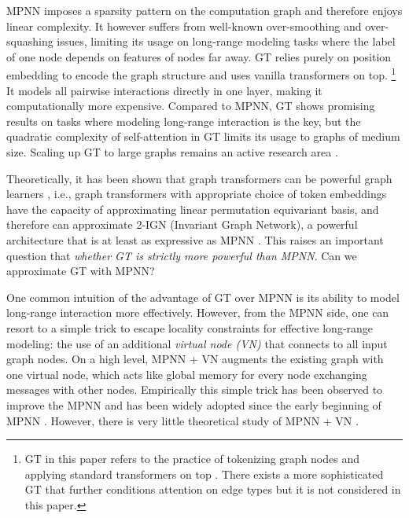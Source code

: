 \documentclass[nohyperref]{article}
\theoremstyle{plain}
\theoremstyle{definition}
\theoremstyle{remark}
\begin{document}
MPNN imposes a sparsity pattern on the computation graph and therefore enjoys linear complexity. It however suffers from well-known over-smoothing \citep{li2018deeper,oono2019graph,cai2020note} and over-squashing \citep{alon2020bottleneck,topping2021understanding} issues, limiting its usage on long-range modeling tasks where the label of one node depends on features of nodes far away. GT relies purely on position embedding to encode the graph structure and uses vanilla transformers on top. \footnote{GT in this paper refers to the practice of tokenizing graph nodes and applying standard transformers on top \citep{ying2021transformers,kim2022pure}. There exists a more sophisticated GT \citep{kreuzer2021rethinking} that further conditions attention on edge types but it is not considered in this paper. } It models all pairwise interactions directly in one layer, making it computationally more expensive. Compared to MPNN, GT shows promising results on tasks where modeling long-range interaction is the key, but the quadratic complexity of self-attention in GT limits its usage to graphs of medium size. Scaling up GT to large graphs remains an active research area \citep{wunodeformer}. 


Theoretically, it has been shown that graph transformers can be powerful graph learners \citep{kim2022pure}, i.e., graph transformers with appropriate choice of token embeddings have the capacity of approximating linear permutation equivariant basis, and therefore can approximate 2-IGN (Invariant Graph Network), a powerful architecture that is at least as expressive as MPNN \citep{maron2018invariant}. This raises an important question that \textit{whether GT is strictly more powerful than MPNN}. Can we approximate GT with MPNN?



One common intuition of the advantage of GT over MPNN is its ability to model long-range interaction more effectively. However, from the MPNN side, one can resort to a simple trick to escape locality constraints for effective long-range modeling: the use of an additional \emph{virtual node (VN)} that connects to all input graph nodes. On a high level, MPNN + VN augments the existing graph with one virtual node, which acts like global memory for every node exchanging messages with other nodes. Empirically this simple trick has been observed to improve the MPNN and has been widely adopted \citep{gilmer2017neural,hu2020open,hu2021ogb} since the early beginning of MPNN \citep{gilmer2017neural, battaglia2018relational}. However, there is very little theoretical study of MPNN + VN \citep{hwanganalysis}. 
\end{document}
